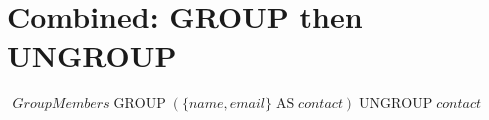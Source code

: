 \documentclass[a4paper,10pt,fleqn]{article}
\begin{document}
\bigskip

\section*{Combined: GROUP then UNGROUP}

\noindent
$\displaystyle
\begin{array}{l}
GroupMembers \mathop{\mathrm{GROUP}} (\{name, email\} \mathop{\mathrm{AS}} contact) \mathop{\mathrm{UNGROUP}} contact \\
\quad 
\end{array}$

\bigskip
\end{document}
